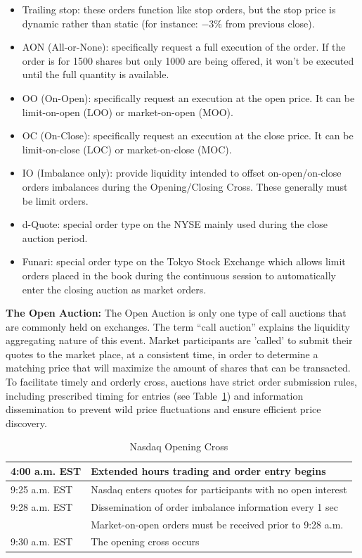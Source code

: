 \begin{itemize}
\item  Trailing stop: these orders function like stop orders, but the stop price is dynamic rather than static (for instance: $-3$\% from previous close).

\item  AON (All-or-None): specifically request a full execution of the order. If the order is for 1500 shares but only 1000 are being offered, it won't be executed until the full quantity is available.

\item  OO (On-Open): specifically request an execution at the open price. It can be limit-on-open (LOO) or market-on-open (MOO).

\item  OC (On-Close): specifically request an execution at the close price. It can be limit-on-close (LOC) or market-on-close (MOC).

\item  IO (Imbalance only): provide liquidity intended to offset on-open/on-close orders imbalances during the Opening/Closing Cross. These generally must be limit orders.

\item  d-Quote: special order type on the NYSE mainly used during the close auction period.

\item  Funari: special order type on the Tokyo Stock Exchange which allows limit orders placed in the book during the continuous session to automatically enter the closing auction as market orders. \\
\end{itemize} 


\noindent\textbf{The Open Auction:} The Open Auction is only one type of call auctions that are commonly held on exchanges. The term ``call auction'' explains the liquidity aggregating nature of this event. Market participants are 'called' to submit their quotes to the market place, at a consistent time, in order to determine a matching price that will maximize the amount of shares that can be transacted. To facilitate timely and orderly cross, auctions have strict order submission rules, including prescribed timing for entries (see Table~\ref{tab:NASDAQopen}) and information dissemination to prevent wild price fluctuations and ensure efficient price discovery.

\begin{table}[!ht]
   \centering
   \caption{Nasdaq Opening Cross \label{tab:NASDAQopen}}
   \begin{tabular}{ll} 
	4:00 a.m. EST & Extended hours trading and order entry begins  \\ \hline
	9:25 a.m. EST & Nasdaq enters quotes for participants with no open interest \\ \hline
	9:28 a.m. EST & Dissemination of order imbalance information every 1 sec  \\ 
	 & Market-on-open orders must be received prior to 9:28 a.m.   \\ \hline	
	9:30 a.m. EST & The opening cross occurs		
   \end{tabular}
\end{table}	


